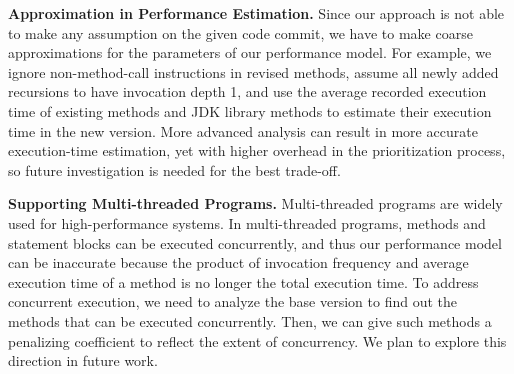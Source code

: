 \textbf{Approximation in Performance Estimation.} Since our approach is not able to make any assumption on the given code commit, we have to make coarse approximations for the parameters of our performance model. For example, we ignore non-method-call instructions in revised methods, assume all newly added recursions to have invocation depth 1, and use the average recorded execution time of existing methods and JDK library methods to estimate their execution time in the new version. More advanced analysis can result in more accurate execution-time estimation, yet with higher overhead in the prioritization process, so future investigation is needed for the best trade-off. 


\textbf{Supporting Multi-threaded Programs.} Multi-threaded programs are widely used for high-performance systems. In multi-threaded programs, methods and statement blocks can be executed concurrently, and thus our performance model can be inaccurate because the product of invocation frequency and average execution time of a method is no longer the total execution time. To address concurrent execution, we need to analyze the base version to find out the methods that can be executed concurrently. Then, we can give such methods a penalizing coefficient to reflect the extent of concurrency. We plan to explore this direction in  future work. 


